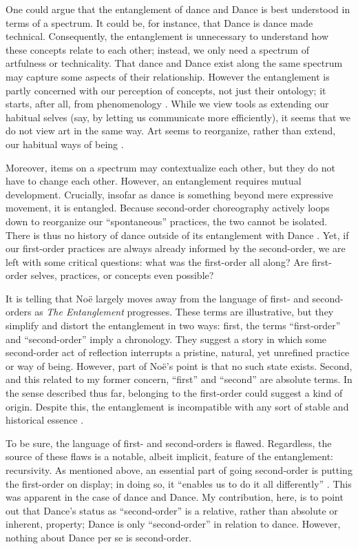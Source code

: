 \documentclass[12pt,letterpaper]{article}
\begin{document}
One could argue that the entanglement of dance and Dance is best understood in
terms of a spectrum. It could be, for instance, that Dance is dance made
technical. Consequently, the entanglement is unnecessary to understand how these
concepts relate to each other; instead, we only need a spectrum of artfulness or
technicality. That dance and Dance exist along the same spectrum may capture
some aspects of their relationship. However the entanglement is partly concerned
with our perception of concepts, not just their ontology; it starts, after all,
from phenomenology \autocite[21--22]{noeEntanglement2023}. While we view tools
as extending our habitual selves (say, by letting us communicate more
efficiently), it seems that we do not view art in the same way. Art seems to
reorganize, rather than extend, our habitual ways of being
\autocite[21--22]{noeEntanglement2023}.

Moreover, items on a spectrum may contextualize each other, but they do not have
to change each other. However, an entanglement requires mutual development.
Crucially, insofar as dance is something beyond mere expressive movement, it is
entangled. Because second-order choreography actively loops down to reorganize
our ``spontaneous'' practices, the two cannot be isolated. There is thus no
history of dance outside of its entanglement with Dance
\autocite[32]{noeEntanglement2023}. Yet, if our first-order practices are always
already informed by the second-order, we are left with some critical questions:
what was the first-order all along? Are first-order selves, practices, or
concepts even possible?

It is telling that Noë largely moves away from the language of first- and
second-orders as \textit{The Entanglement} progresses. These terms are
illustrative, but they simplify and distort the entanglement in two ways: first,
the terms ``first-order'' and ``second-order'' imply a chronology. They suggest
a story in which some second-order act of reflection interrupts a pristine,
natural, yet unrefined practice or way of being. However, part of Noë's point is
that no such state exists. Second, and this related to my former concern,
``first'' and ``second'' are absolute terms. In the sense described thus far,
belonging to the first-order could suggest a kind of origin. Despite this, the
entanglement is incompatible with any sort of stable and historical essence
\autocite[32]{noeEntanglement2023}.

To be sure, the language of first- and second-orders is flawed. Regardless, the
source of these flaws is a notable, albeit implicit, feature of the
entanglement: recursivity. As mentioned above, an essential part of going
second-order is putting the first-order on display; in doing so, it ``enables
us to do it all differently'' \autocite[42]{noeEntanglement2023}. This was
apparent in the case of dance and Dance. My contribution, here, is to point out
that Dance's status as ``second-order'' is a relative, rather than absolute or
inherent, property; Dance is only ``second-order'' in relation to dance.
However, nothing about Dance per se is second-order.
\end{document}
